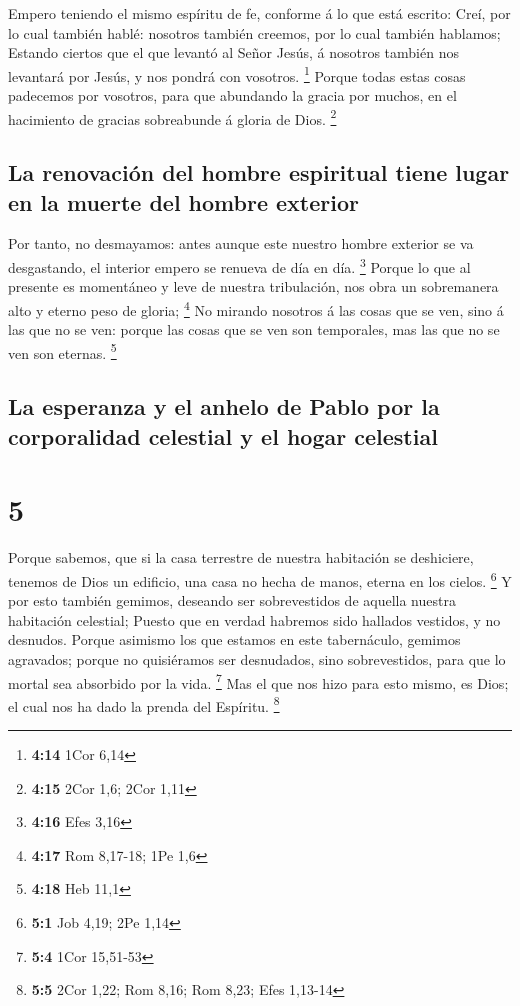  Empero teniendo el mismo espíritu de fe, conforme á lo que
está escrito: Creí, por lo cual también hablé: nosotros también creemos,
por lo cual también hablamos;  Estando ciertos que el que
levantó al Señor Jesús, á nosotros también nos levantará por Jesús, y
nos pondrá con vosotros. \footnote{\textbf{4:14} 1Cor 6,14}
 Porque todas estas cosas padecemos por vosotros, para que
abundando la gracia por muchos, en el hacimiento de gracias sobreabunde
á gloria de Dios. \footnote{\textbf{4:15} 2Cor 1,6; 2Cor 1,11}

\hypertarget{la-renovaciuxf3n-del-hombre-espiritual-tiene-lugar-en-la-muerte-del-hombre-exterior}{%
\subsection{La renovación del hombre espiritual tiene lugar en la muerte
del hombre
exterior}\label{la-renovaciuxf3n-del-hombre-espiritual-tiene-lugar-en-la-muerte-del-hombre-exterior}}

 Por tanto, no desmayamos: antes aunque este nuestro hombre
exterior se va desgastando, el interior empero se renueva de día en día.
\footnote{\textbf{4:16} Efes 3,16}  Porque lo que al
presente es momentáneo y leve de nuestra tribulación, nos obra un
sobremanera alto y eterno peso de gloria; \footnote{\textbf{4:17} Rom
  8,17-18; 1Pe 1,6}  No mirando nosotros á las cosas que se
ven, sino á las que no se ven: porque las cosas que se ven son
temporales, mas las que no se ven son eternas. \footnote{\textbf{4:18}
  Heb 11,1}

\hypertarget{la-esperanza-y-el-anhelo-de-pablo-por-la-corporalidad-celestial-y-el-hogar-celestial}{%
\subsection{La esperanza y el anhelo de Pablo por la corporalidad
celestial y el hogar
celestial}\label{la-esperanza-y-el-anhelo-de-pablo-por-la-corporalidad-celestial-y-el-hogar-celestial}}

\hypertarget{section-4}{%
\section{5}\label{section-4}}

 Porque sabemos, que si la casa terrestre de nuestra
habitación se deshiciere, tenemos de Dios un edificio, una casa no hecha
de manos, eterna en los cielos. \footnote{\textbf{5:1} Job 4,19; 2Pe
  1,14}  Y por esto también gemimos, deseando ser
sobrevestidos de aquella nuestra habitación celestial; 
Puesto que en verdad habremos sido hallados vestidos, y no desnudos.
 Porque asimismo los que estamos en este tabernáculo,
gemimos agravados; porque no quisiéramos ser desnudados, sino
sobrevestidos, para que lo mortal sea absorbido por la vida. \footnote{\textbf{5:4}
  1Cor 15,51-53}  Mas el que nos hizo para esto mismo, es
Dios; el cual nos ha dado la prenda del Espíritu. \footnote{\textbf{5:5}
  2Cor 1,22; Rom 8,16; Rom 8,23; Efes 1,13-14}

